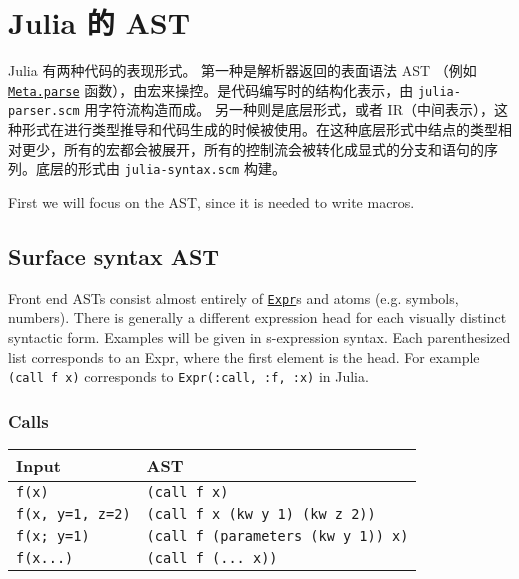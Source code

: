 \hypertarget{13955728449382648563}{}


\section{Julia 的 AST}



Julia 有两种代码的表现形式。 第一种是解析器返回的表面语法 AST （例如 \hyperlink{10422957797582368651}{\texttt{Meta.parse}} 函数），由宏来操控。是代码编写时的结构化表示，由 \texttt{julia-parser.scm} 用字符流构造而成。 另一种则是底层形式，或者 IR（中间表示），这种形式在进行类型推导和代码生成的时候被使用。在这种底层形式中结点的类型相对更少，所有的宏都会被展开，所有的控制流会被转化成显式的分支和语句的序列。底层的形式由 \texttt{julia-syntax.scm} 构建。



First we will focus on the AST, since it is needed to write macros.



\hypertarget{6198433338459689204}{}


\subsection{Surface syntax AST}



Front end ASTs consist almost entirely of \hyperlink{17120496304147995299}{\texttt{Expr}}s and atoms (e.g. symbols, numbers). There is generally a different expression head for each visually distinct syntactic form. Examples will be given in s-expression syntax. Each parenthesized list corresponds to an Expr, where the first element is the head. For example \texttt{(call f x)} corresponds to \texttt{Expr(:call, :f, :x)} in Julia.



\hypertarget{13191950853363974893}{}


\subsubsection{Calls}




\begin{table}[h]

\begin{tabulary}{\linewidth}{|L|L|}
\hline
Input & AST \\
\hline
\texttt{f(x)} & \texttt{(call f x)} \\
\hline
\texttt{f(x, y=1, z=2)} & \texttt{(call f x (kw y 1) (kw z 2))} \\
\hline
\texttt{f(x; y=1)} & \texttt{(call f (parameters (kw y 1)) x)} \\
\hline
\texttt{f(x...)} & \texttt{(call f (... x))} \\
\hline
\end{tabulary}

\end{table}



